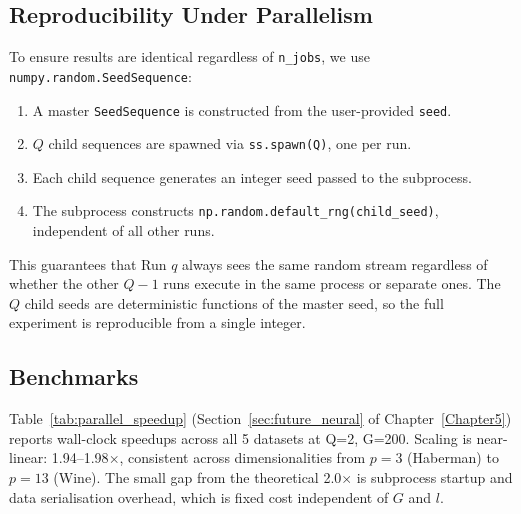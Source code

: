 \subsection{Reproducibility Under Parallelism}

To ensure results are identical regardless of \texttt{n\_jobs}, we use \texttt{numpy.random.SeedSequence}:

\begin{enumerate}
    \item A master \texttt{SeedSequence} is constructed from the user-provided \texttt{seed}.
    \item $Q$ child sequences are spawned via \texttt{ss.spawn(Q)}, one per run.
    \item Each child sequence generates an integer seed passed to the subprocess.
    \item The subprocess constructs \texttt{np.random.default\_rng(child\_seed)}, independent of all other runs.
\end{enumerate}

This guarantees that Run $q$ always sees the same random stream regardless of whether the other $Q-1$ runs execute in the same process or separate ones. The $Q$ child seeds are deterministic functions of the master seed, so the full experiment is reproducible from a single integer.

\subsection{Benchmarks}

Table~\ref{tab:parallel_speedup} (Section~\ref{sec:future_neural} of Chapter~\ref{Chapter5}) reports wall-clock speedups across all 5 datasets at Q=2, G=200. Scaling is near-linear: 1.94--1.98$\times$, consistent across dimensionalities from $p=3$ (Haberman) to $p=13$ (Wine). The small gap from the theoretical 2.0$\times$ is subprocess startup and data serialisation overhead, which is fixed cost independent of $G$ and $l$.
